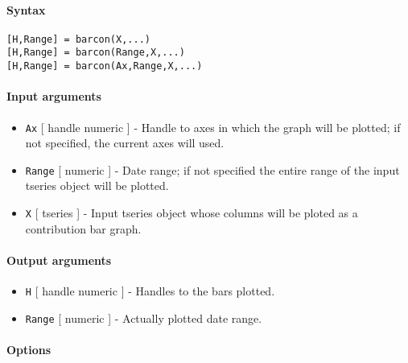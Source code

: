 


	\paragraph{Syntax}\label{syntax}

\begin{verbatim}
[H,Range] = barcon(X,...)
[H,Range] = barcon(Range,X,...)
[H,Range] = barcon(Ax,Range,X,...)
\end{verbatim}

\paragraph{Input arguments}\label{input-arguments}

\begin{itemize}
\item
  \texttt{Ax} {[} handle \textbar{} numeric {]} - Handle to axes in
  which the graph will be plotted; if not specified, the current axes
  will used.
\item
  \texttt{Range} {[} numeric {]} - Date range; if not specified the
  entire range of the input tseries object will be plotted.
\item
  \texttt{X} {[} tseries {]} - Input tseries object whose columns will
  be ploted as a contribution bar graph.
\end{itemize}

\paragraph{Output arguments}\label{output-arguments}

\begin{itemize}
\item
  \texttt{H} {[} handle \textbar{} numeric {]} - Handles to the bars
  plotted.
\item
  \texttt{Range} {[} numeric {]} - Actually plotted date range.
\end{itemize}

\paragraph{Options}\label{options}

